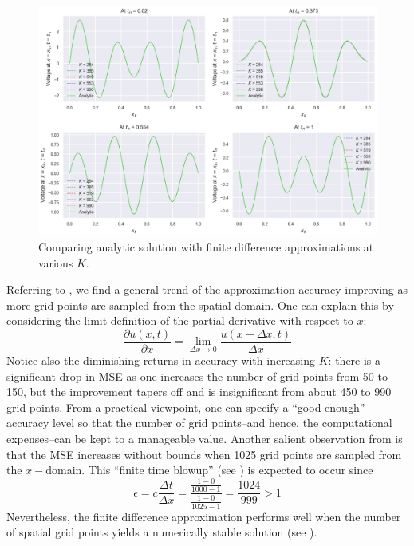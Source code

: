 \documentclass{article}
\begin{document}
\begin{figure}[t!]
   \centering
   \includegraphics[scale=0.7]{on spatial domain discretization - analytic vs numerical.png}
   \caption{Comparing analytic solution with finite difference approximations at various $K$.}
	\label{fig: On Spatial Domain Discretization results: Analytic vs numerical solutions}
\end{figure}

Referring to ,
we find a general trend of the approximation accuracy improving
as more grid points are sampled from the spatial domain.
One can explain this by considering the limit definition of the partial derivative with respect to $x$:
\begin{equation}
   \label{eqn: Limit definition of the partial derivative wrt to x}
   \frac{\partial u \left(x,t\right)}{\partial x}
   =
   \lim_{\Delta x \longrightarrow 0}
   \frac{u \left(x + \Delta x, t\right)}{\Delta x}
\end{equation}
Notice also the diminishing returns in accuracy with increasing $K$:
there is a significant drop in MSE as one increases the number of grid points from 50 to 150,
but the improvement tapers off and is insignificant from about 450 to 990 grid points.
From a practical viewpoint, one can specify a ``good enough'' accuracy level so that the number of grid points--and hence,
the computational expenses--can be kept to a manageable value.
Another salient observation from 
is that the MSE increases without bounds when 1025 grid points are sampled from the $x-$domain.
This ``finite time blowup'' (see )
is expected to occur since
\begin{equation*}
   \epsilon = c \frac{\Delta t}{\Delta x} = \frac{\frac{1 - 0}{1000 - 1}}{\frac{1 - 0}{1025 - 1}} = \frac{1024}{999} > 1
\end{equation*}
Nevertheless, the finite difference approximation performs well when the number of spatial grid points yields a numerically stable solution
(see ).
\end{document}
